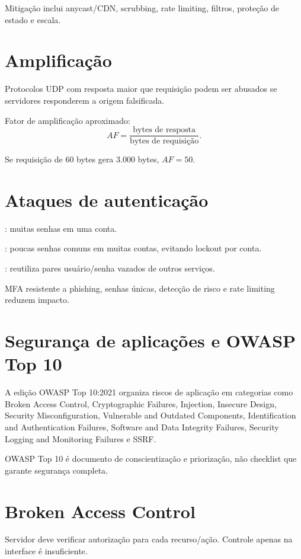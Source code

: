 Mitigação inclui anycast/CDN, scrubbing, rate limiting, filtros, proteção de estado e escala.

\section{Amplificação}

Protocolos UDP com resposta maior que requisição podem ser abusados se servidores responderem a origem falsificada.

Fator de amplificação aproximado:
\[
AF=\frac{\text{bytes de resposta}}{\text{bytes de requisição}}.
\]

Se requisição de 60 bytes gera 3.000 bytes, $AF=50$.

\section{Ataques de autenticação}

: muitas senhas em uma conta.

: poucas senhas comuns em muitas contas, evitando lockout por conta.

: reutiliza pares usuário/senha vazados de outros serviços.

MFA resistente a phishing, senhas únicas, detecção de risco e rate limiting reduzem impacto.

\section{Segurança de aplicações e OWASP Top 10}

A edição OWASP Top 10:2021 organiza riscos de aplicação em categorias como Broken Access Control, Cryptographic Failures, Injection, Insecure Design, Security Misconfiguration, Vulnerable and Outdated Components, Identification and Authentication Failures, Software and Data Integrity Failures, Security Logging and Monitoring Failures e SSRF.

OWASP Top 10 é documento de conscientização e priorização, não checklist que garante segurança completa.

\section{Broken Access Control}

Servidor deve verificar autorização para cada recurso/ação. Controle apenas na interface é insuficiente.

